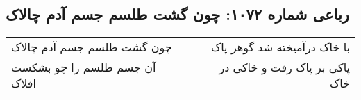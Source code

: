 \begin{center}
\section*{رباعی شماره ۱۰۷۲: چون گشت طلسم جسم آدم چالاک}
\label{sec:1072}
\begin{longtable}{l p{0.5cm} r}
چون گشت طلسم جسم آدم چالاک
&&
با خاک درآمیخته شد گوهر پاک
\\
آن جسم طلسم را چو بشکست افلاک
&&
پاکی بر پاک رفت و خاکی در خاک
\\
\end{longtable}
\end{center}
